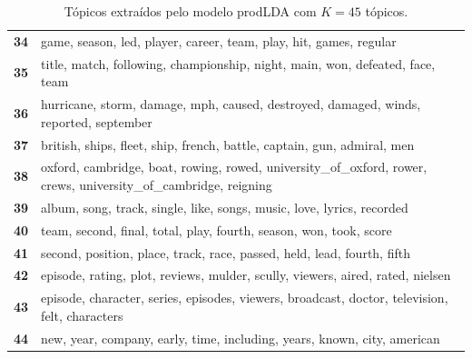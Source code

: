 \begin{table}[htpb]
\begin{tabularx}{\textwidth}{@{}l X@{}}
        \textbf{34} & game, season, led, player, career, team, play, hit, games, regular \\
        \textbf{35} & title, match, following, championship, night, main, won, defeated, face, team \\
        \textbf{36} & hurricane, storm, damage, mph, caused, destroyed, damaged, winds, reported, september \\
        \textbf{37} & british, ships, fleet, ship, french, battle, captain, gun, admiral, men \\
        \textbf{38} & oxford, cambridge, boat, rowing, rowed, university\_of\_oxford, rower, crews, university\_of\_cambridge, reigning \\
        \textbf{39} & album, song, track, single, like, songs, music, love, lyrics, recorded \\
        \textbf{40} & team, second, final, total, play, fourth, season, won, took, score \\
        \textbf{41} & second, position, place, track, race, passed, held, lead, fourth, fifth \\
        \textbf{42} & episode, rating, plot, reviews, mulder, scully, viewers, aired, rated, nielsen \\
        \textbf{43} & episode, character, series, episodes, viewers, broadcast, doctor, television, felt, characters \\
        \textbf{44} & new, year, company, early, time, including, years, known, city, american \\
        \bottomrule
    \end{tabularx}
    \caption{Tópicos extraídos pelo modelo prodLDA com $K=45$ tópicos.}
    \label{tab:topicos_prodlda_45}
\end{table}
